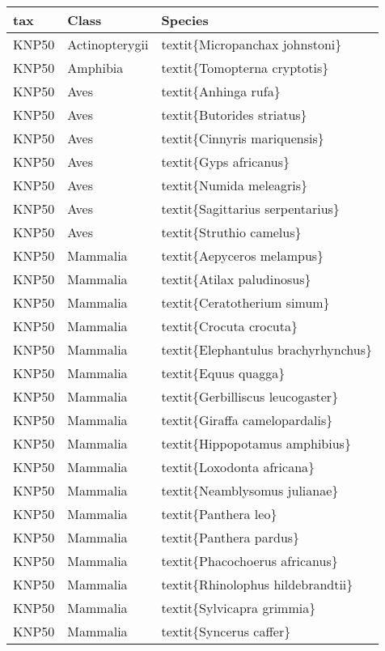 \begin{longtable}{lll}
  \hline
tax & Class & Species \\ 
  \hline
KNP50 & Actinopterygii & textit\{Micropanchax johnstoni\} \\ 
  KNP50 & Amphibia & textit\{Tomopterna cryptotis\} \\ 
  KNP50 & Aves & textit\{Anhinga rufa\} \\ 
  KNP50 & Aves & textit\{Butorides striatus\} \\ 
  KNP50 & Aves & textit\{Cinnyris mariquensis\} \\ 
  KNP50 & Aves & textit\{Gyps africanus\} \\ 
  KNP50 & Aves & textit\{Numida meleagris\} \\ 
  KNP50 & Aves & textit\{Sagittarius serpentarius\} \\ 
  KNP50 & Aves & textit\{Struthio camelus\} \\ 
  KNP50 & Mammalia & textit\{Aepyceros melampus\} \\ 
  KNP50 & Mammalia & textit\{Atilax paludinosus\} \\ 
  KNP50 & Mammalia & textit\{Ceratotherium simum\} \\ 
  KNP50 & Mammalia & textit\{Crocuta crocuta\} \\ 
  KNP50 & Mammalia & textit\{Elephantulus brachyrhynchus\} \\ 
  KNP50 & Mammalia & textit\{Equus quagga\} \\ 
  KNP50 & Mammalia & textit\{Gerbilliscus leucogaster\} \\ 
  KNP50 & Mammalia & textit\{Giraffa camelopardalis\} \\ 
  KNP50 & Mammalia & textit\{Hippopotamus amphibius\} \\ 
  KNP50 & Mammalia & textit\{Loxodonta africana\} \\ 
  KNP50 & Mammalia & textit\{Neamblysomus julianae\} \\ 
  KNP50 & Mammalia & textit\{Panthera leo\} \\ 
  KNP50 & Mammalia & textit\{Panthera pardus\} \\ 
  KNP50 & Mammalia & textit\{Phacochoerus africanus\} \\ 
  KNP50 & Mammalia & textit\{Rhinolophus hildebrandtii\} \\ 
  KNP50 & Mammalia & textit\{Sylvicapra grimmia\} \\ 
  KNP50 & Mammalia & textit\{Syncerus caffer\} \\ 

\end{longtable}
